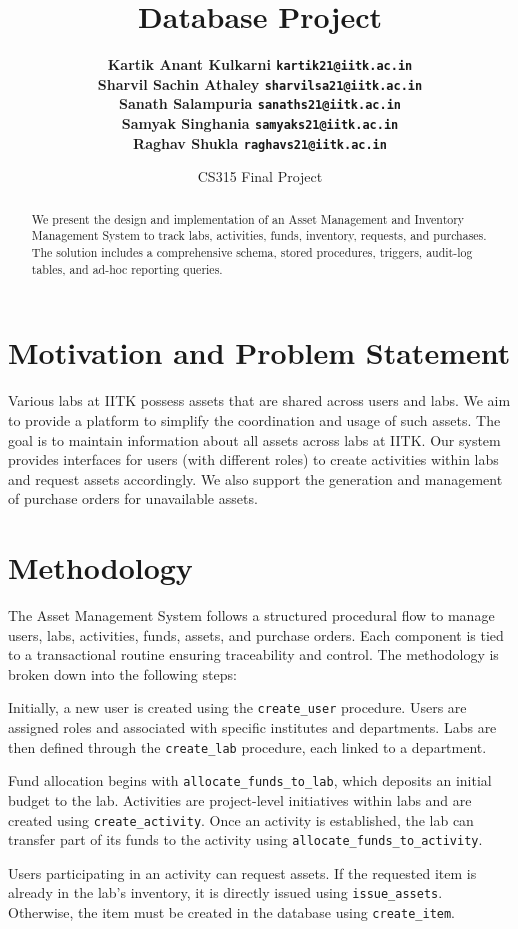 \documentclass[11pt]{article}
\title{\bf Database Project}
\author{
  \bf Kartik Anant Kulkarni \qquad 210493 \qquad \texttt{kartik21@iitk.ac.in} \\
  \bf Sharvil Sachin Athaley \qquad 210961 \qquad \texttt{sharvilsa21@iitk.ac.in} \\
  \bf Sanath Salampuria \qquad 210919 \qquad \texttt{sanaths21@iitk.ac.in} \\
  \bf Samyak Singhania \qquad 210917 \qquad \texttt{samyaks21@iitk.ac.in} \\
  \bf Raghav Shukla \qquad 210800 \qquad \texttt{raghavs21@iitk.ac.in}
}
\date{CS315 Final Project}
\begin{document}
\maketitle

\begin{abstract}
We present the design and implementation of an Asset Management and Inventory Management System to track labs, activities, funds, inventory, requests, and purchases. The solution includes a comprehensive schema, stored procedures, triggers, audit-log tables, and ad-hoc reporting queries.
\end{abstract}

\section{Motivation and Problem Statement}
Various labs at IITK possess assets that are shared across users and labs. We aim to provide a platform to simplify the coordination and usage of such assets. The goal is to maintain information about all assets across labs at IITK. Our system provides interfaces for users (with different roles) to create activities within labs and request assets accordingly. We also support the generation and management of purchase orders for unavailable assets.

\section{Methodology}

The Asset Management System follows a structured procedural flow to manage users, labs, activities, funds, assets, and purchase orders. Each component is tied to a transactional routine ensuring traceability and control. The methodology is broken down into the following steps:

Initially, a new user is created using the \texttt{create\_user} procedure. Users are assigned roles and associated with specific institutes and departments. Labs are then defined through the \texttt{create\_lab} procedure, each linked to a department.

Fund allocation begins with \texttt{allocate\_funds\_to\_lab}, which deposits an initial budget to the lab. Activities are project-level initiatives within labs and are created using \texttt{create\_activity}. Once an activity is established, the lab can transfer part of its funds to the activity using \texttt{allocate\_funds\_to\_activity}.

Users participating in an activity can request assets. If the requested item is already in the lab's inventory, it is directly issued using \texttt{issue\_assets}. Otherwise, the item must be created in the database using \texttt{create\_item}.
\end{document}
